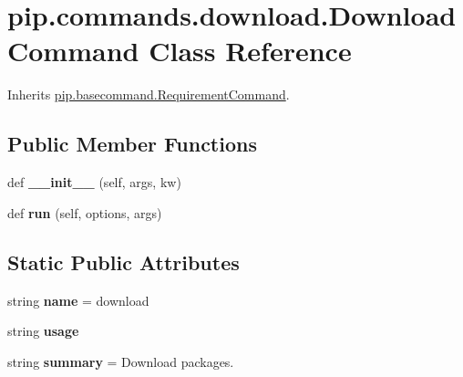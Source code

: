 \hypertarget{classpip_1_1commands_1_1download_1_1_download_command}{}\section{pip.\+commands.\+download.\+Download\+Command Class Reference}
\label{classpip_1_1commands_1_1download_1_1_download_command}


Inherits \hyperlink{classpip_1_1basecommand_1_1_requirement_command}{pip.\+basecommand.\+Requirement\+Command}.

\subsection*{Public Member Functions}
\begin{DoxyCompactItemize}
\item 
\mbox{\label{classpip_1_1commands_1_1download_1_1_download_command_a29ff1d499ba5fb58060364a38b4fd2d5}} 
def {\bfseries \+\_\+\+\_\+init\+\_\+\+\_\+} (self, args, kw)
\item 
\mbox{\label{classpip_1_1commands_1_1download_1_1_download_command_a98c1875e9fda5962faacd71826d7db0e}} 
def {\bfseries run} (self, options, args)
\end{DoxyCompactItemize}
\subsection*{Static Public Attributes}
\begin{DoxyCompactItemize}
\item 
\mbox{\label{classpip_1_1commands_1_1download_1_1_download_command_a4d35d31913da485b984312ee05a8a287}} 
string {\bfseries name} = \textquotesingle{}download\textquotesingle{}
\item 
string {\bfseries usage}
\item 
\mbox{\label{classpip_1_1commands_1_1download_1_1_download_command_a3d08ec762e791e985291deb106c054b1}} 
string {\bfseries summary} = \textquotesingle{}Download packages.\textquotesingle{}
\end{DoxyCompactItemize}
